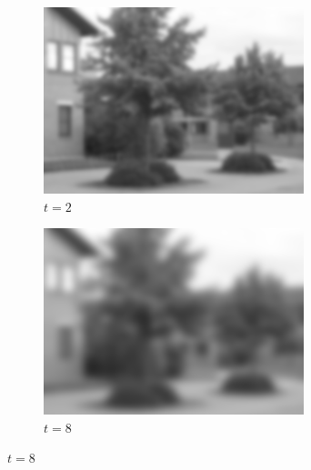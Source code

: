 \documentclass[a4paper,12pt]{article}
\begin{document}
\begin{figure}[h]
    \begin{subfigure}[b]{0.4\linewidth}
    \includegraphics[width=\linewidth]{Scalespace2.png}
    \caption{$t=2$}
    \end{subfigure}
    \begin{subfigure}[b]{0.4\linewidth}
    \includegraphics[width=\linewidth]{Scalespace3.png}
    \caption{$t=8$}
    \end{subfigure}


\end{figure}
\end{document}
